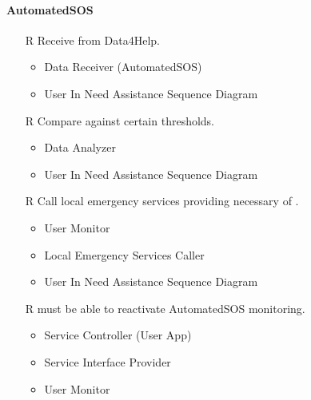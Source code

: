 \paragraph{AutomatedSOS}
\begin{itemize}
	\item[R\subs{36}]Receive  from Data4Help.
	\begin{itemize}
		\item Data Receiver (AutomatedSOS)
		\item User In Need Assistance Sequence Diagram
	\end{itemize}
	\item[R\subs{37}]Compare  against certain thresholds.
	\begin{itemize}
		\item Data Analyzer
		\item User In Need Assistance Sequence Diagram
	\end{itemize}
	\item[R\subs{38}]Call local emergency services providing necessary  of .
	\begin{itemize}
		\item User Monitor
		\item Local Emergency Services Caller
		\item User In Need Assistance Sequence Diagram
	\end{itemize}
	\item[R\subs{39}] must be able to reactivate AutomatedSOS monitoring.
	\begin{itemize}
		\item Service Controller (User App)
		\item Service Interface Provider
		\item User Monitor
	\end{itemize}
\end{itemize}


